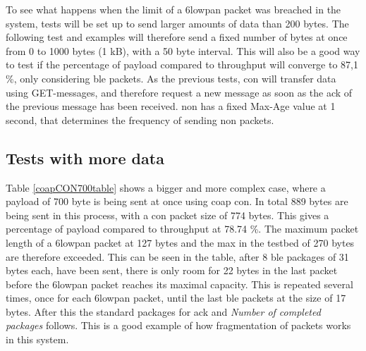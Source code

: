 

\noindent To see what happens when the limit of a \gls{6lowpan} packet was breached in the system, tests will be set up to send larger amounts of data than 200 bytes. The following test and examples will therefore send a fixed number of bytes at once from 0 to 1000 bytes (1 kB), with a 50 byte interval. This will also be a good way to test if the percentage of \gls{payload} compared to \gls{throughput} will converge to 87,1 \%, only considering \gls{ble} packets. As the previous tests, \gls{con} will transfer data using GET-messages, and therefore request a new message as soon as the \gls{ack} of the previous message has been received. \gls{non} has a fixed Max-Age value at 1 second, that determines the frequency of sending \gls{non} packets. 


\subsection{Tests with more data}

\noindent Table \ref{coapCON700table} shows a bigger and more complex case, where a payload of 700 byte is being sent at once using \gls{coap} \gls{con}. In total 889 bytes are being sent in this process, with a \gls{con} packet size of 774 bytes. This gives a percentage of \gls{payload} compared to \gls{throughput} at 78.74 \%. The maximum packet length of a \gls{6lowpan} packet at 127 bytes and the max in the testbed of 270 bytes are therefore exceeded. This can be seen in the table, after 8 \gls{ble} packages of 31 bytes each, have been sent, there is only room for 22 bytes in the last packet before the \gls{6lowpan} packet reaches its maximal capacity. This is repeated several times, once for each \gls{6lowpan} packet, until the last \gls{ble} packets at the size of 17 bytes. After this the standard packages for \gls{ack} and \textit{Number of completed packages} follows. This is a good example of how fragmentation of packets works in this system. 


